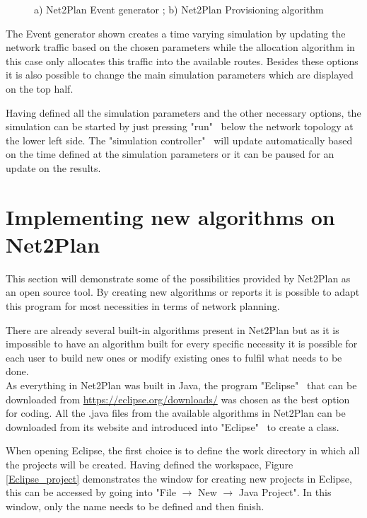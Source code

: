 	\begin{figure}[!h]
		\centering
		\caption{a) Net2Plan Event generator ; b) Net2Plan Provisioning algorithm}
	\end{figure}	

	The Event generator shown creates a time varying simulation by updating the network traffic based on the chosen parameters while the allocation algorithm in this case only allocates this traffic into the available routes. Besides these options it is also possible to change the main simulation parameters which are displayed on the top half.

	Having defined all the simulation parameters and the other necessary options, the simulation can be started by just pressing "run" \ below the network topology at the lower left side. The "simulation controller" \ will update automatically based on the time defined at the simulation parameters or it can be paused for an update on the results.
	
	\newpage

	\section*{Implementing new algorithms on Net2Plan}
	\vspace{1cm}
	This section will demonstrate some of the possibilities provided by Net2Plan as an open source tool. By creating new algorithms or reports it is possible to adapt this program for most necessities in terms of network planning.

	There are already several built-in algorithms present in Net2Plan but as it is impossible to have an algorithm built for every specific necessity it is possible for each user to build new ones or modify existing ones to fulfil what needs to be done.\\
	
	As everything in Net2Plan was built in Java, the program "Eclipse" \ that can be downloaded from \url{https://eclipse.org/downloads/} was chosen as the best option for coding. All the .java files from the available algorithms in Net2Plan can be downloaded from its website and introduced into "Eclipse" \ to create a class.
	
	When opening Eclipse, the first choice is to define the work directory in which all the projects will be created. Having defined the workspace, Figure \ref{Eclipse_project} demonstrates the window for creating new projects in Eclipse, this can be accessed by going into "File $\rightarrow$ New $\rightarrow$ Java Project". In this window, only the name needs to be defined and then finish.
	
